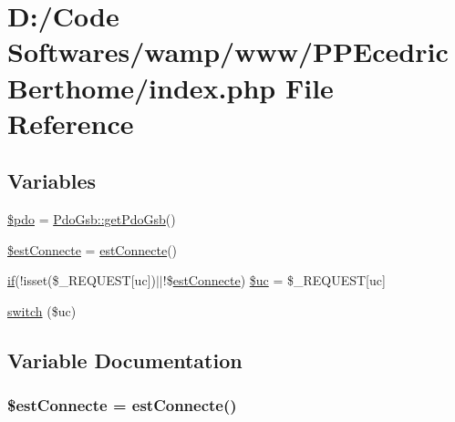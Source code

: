 \hypertarget{index_8php}{}\section{D\+:/\+Code Softwares/wamp/www/\+P\+P\+Ecedric\+Berthome/index.php File Reference}
\label{index_8php}
\subsection*{Variables}
\begin{DoxyCompactItemize}
\item 
\hyperlink{index_8php_a5766efd703cef0e00bfc06b3f3acbe0e}{\$pdo} = \hyperlink{class_pdo_gsb_a37ab3ed998137aeaf4d581365520067e}{Pdo\+Gsb\+::get\+Pdo\+Gsb}()
\item 
\hyperlink{index_8php_af0f433921c4625f043de9faebb5b7bbe}{\$est\+Connecte} = \hyperlink{include_2fct_8inc_8php_a80ca5386d53e29b2b310cb83191a9b31}{est\+Connecte}()
\item 
\hyperlink{jquery_8js_a42cbfadee2b4749e8f699ea8d745a0e4}{if}(!isset(\$\+\_\+\+R\+E\+Q\+U\+E\+ST\mbox{[}\textquotesingle{}uc\textquotesingle{}\mbox{]})$\vert$$\vert$!\$\hyperlink{include_2fct_8inc_8php_a80ca5386d53e29b2b310cb83191a9b31}{est\+Connecte}) \hyperlink{index_8php_a85772ca7b85c824f39906410cb9c74e3}{\$uc} = \$\+\_\+\+R\+E\+Q\+U\+E\+ST\mbox{[}\textquotesingle{}uc\textquotesingle{}\mbox{]}
\item 
\hyperlink{index_8php_a6160ae6d9a60bbcc19780fa9bc2c9b41}{switch} (\$uc)
\end{DoxyCompactItemize}


\subsection{Variable Documentation}
\subsubsection[{\texorpdfstring{\$est\+Connecte}{$estConnecte}}]{\setlength{\rightskip}{0pt plus 5cm}\${\bf est\+Connecte} = {\bf est\+Connecte}()}\hypertarget{index_8php_af0f433921c4625f043de9faebb5b7bbe}{}\label{index_8php_af0f433921c4625f043de9faebb5b7bbe}
